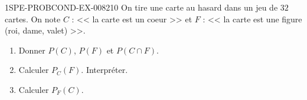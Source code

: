 \begin{exercice}{1SPE-PROBCOND-EX-008}{2}{10}
On tire une carte au hasard dans un jeu de $32$ cartes. On note $C$ : << la carte est un coeur >> et $F$ : << la carte est une figure (roi, dame, valet) >>.

\begin{enumerate}
  \item Donner $P(C)$, $P(F)$ et $P(C \cap F)$.
  \item Calculer $P_C(F)$. Interpréter.
  \item Calculer $P_F(C)$.
\end{enumerate}
\end{exercice}
